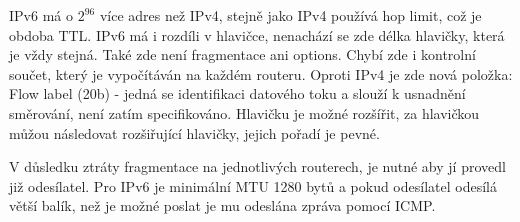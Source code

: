 \documentclass{szzclass}
\begin{document}
IPv6 má o $2^96$ více adres než IPv4, stejně jako IPv4 používá hop limit, což je obdoba TTL. IPv6 má i rozdíli v hlavičce, nenachází se zde délka hlavičky, která je vždy
stejná. Také zde není fragmentace ani options. Chybí zde i kontrolní součet, který je vypočítáván na každém routeru. Oproti IPv4 je zde nová položka: Flow label (20b) - jedná se
identifikaci datového toku a slouží k usnadnění směrování, není zatím specifikováno. Hlavičku je možné rozšířit, za hlavičkou můžou následovat rozšiřující hlavičky, jejich pořadí je pevné.

V důsledku ztráty fragmentace na jednotlivých routerech, je nutné aby jí provedl již odesílatel. Pro IPv6 je minimální MTU 1280 bytů a pokud odesílatel odesílá větší balík, než je možné poslat
je mu odeslána zpráva pomocí ICMP.
\end{document}
